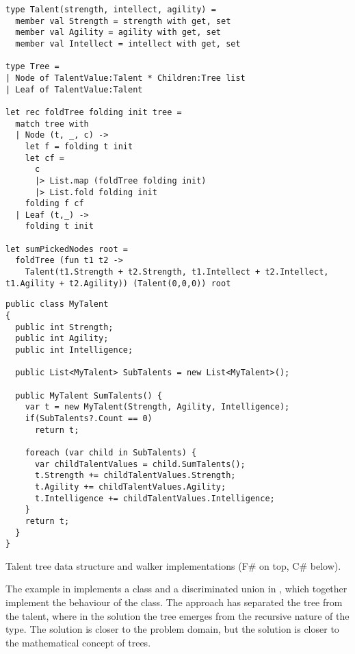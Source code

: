 \begin{listing}[H]
  \begin{verbatim}
type Talent(strength, intellect, agility) =
  member val Strength = strength with get, set
  member val Agility = agility with get, set
  member val Intellect = intellect with get, set

type Tree =
| Node of TalentValue:Talent * Children:Tree list
| Leaf of TalentValue:Talent

let rec foldTree folding init tree =
  match tree with
  | Node (t, _, c) ->
    let f = folding t init
    let cf =
      c
      |> List.map (foldTree folding init)
      |> List.fold folding init
    folding f cf
  | Leaf (t,_) ->
    folding t init

let sumPickedNodes root =
  foldTree (fun t1 t2 ->
    Talent(t1.Strength + t2.Strength, t1.Intellect + t2.Intellect, t1.Agility + t2.Agility)) (Talent(0,0,0)) root
  \end{verbatim}
  \begin{verbatim}
public class MyTalent
{
  public int Strength;
  public int Agility;
  public int Intelligence;

  public List<MyTalent> SubTalents = new List<MyTalent>();

  public MyTalent SumTalents() {
    var t = new MyTalent(Strength, Agility, Intelligence);
    if(SubTalents?.Count == 0)
      return t;

    foreach (var child in SubTalents) {
      var childTalentValues = child.SumTalents();
      t.Strength += childTalentValues.Strength;
      t.Agility += childTalentValues.Agility;
      t.Intelligence += childTalentValues.Intelligence;
    }
    return t;
  }
}
  \end{verbatim}
  \caption{Talent tree data structure and walker implementations (F\# on top, C\# below).}
  \label{lst:tree-imps}
\end{listing}

The example in  implements a class and a discriminated union in \fs, which together implement the behaviour of the \cs class. The \fs approach has separated the tree from the talent, where in the  \cs solution the tree emerges from the recursive nature of the type. The \cs solution is closer to the problem domain, but the \fs solution is closer to the mathematical concept of trees.
